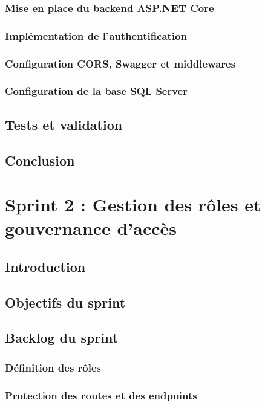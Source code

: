 \documentclass[12pt,a4paper]{report}
\begin{document}
\subsection{Mise en place du backend ASP.NET Core}
\subsection{Implémentation de l'authentification}
\subsection{Configuration CORS, Swagger et middlewares}
\subsection{Configuration de la base SQL Server}
\section{Tests et validation}
\section{Conclusion}


\chapter{Sprint 2 : Gestion des rôles et gouvernance d'accès}

\section{Introduction}
\section{Objectifs du sprint}
\section{Backlog du sprint}
\subsection{Définition des rôles}
\subsection{Protection des routes et des endpoints}
\end{document}
